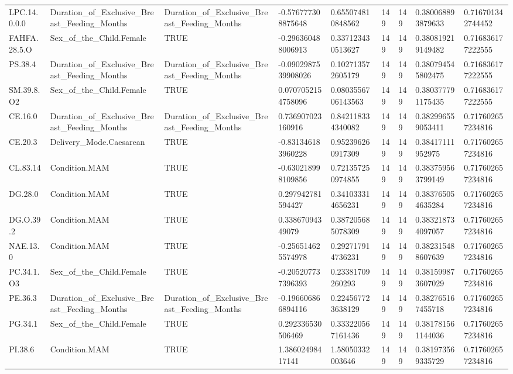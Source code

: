 \begin{longtable}{lllllllll}
LPC.14.0.0.0 & Duration\_of\_Exclusive\_Breast\_Feeding\_Months & Duration\_of\_Exclusive\_Breast\_Feeding\_Months & -0.576777308875648 & 0.655074810848562 & 149 & 149 & 0.380068893879633 & 0.716701342744452 \\
FAHFA.28.5.O & Sex\_of\_the\_Child.Female & TRUE & -0.296360488006913 & 0.337123430513627 & 149 & 149 & 0.380819219149482 & 0.716836177222555 \\
PS.38.4 & Duration\_of\_Exclusive\_Breast\_Feeding\_Months & Duration\_of\_Exclusive\_Breast\_Feeding\_Months & -0.0902987539908026 & 0.102713572605179 & 149 & 149 & 0.380794545802475 & 0.716836177222555 \\
SM.39.8.O2 & Sex\_of\_the\_Child.Female & TRUE & 0.0707052154758096 & 0.0803556706143563 & 149 & 149 & 0.380377791175435 & 0.716836177222555 \\
CE.16.0 & Duration\_of\_Exclusive\_Breast\_Feeding\_Months & Duration\_of\_Exclusive\_Breast\_Feeding\_Months & 0.736907023160916 & 0.842118334340082 & 149 & 149 & 0.382996559053411 & 0.717602657234816 \\
CE.20.3 & Delivery\_Mode.Caesarean & TRUE & -0.831346183960228 & 0.952396260917309 & 149 & 149 & 0.38417111952975 & 0.717602657234816 \\
CL.83.14 & Condition.MAM & TRUE & -0.630218998109856 & 0.721357250974855 & 149 & 149 & 0.383759563799149 & 0.717602657234816 \\
DG.28.0 & Condition.MAM & TRUE & 0.297942781594427 & 0.341033314656231 & 149 & 149 & 0.383765054635284 & 0.717602657234816 \\
DG.O.39.2 & Condition.MAM & TRUE & 0.33867094349079 & 0.387205685078309 & 149 & 149 & 0.383218734097057 & 0.717602657234816 \\
NAE.13.0 & Condition.MAM & TRUE & -0.256514625574978 & 0.292717914736231 & 149 & 149 & 0.382315488607639 & 0.717602657234816 \\
PC.34.1.O3 & Sex\_of\_the\_Child.Female & TRUE & -0.205207737396393 & 0.23381709260293 & 149 & 149 & 0.381599873607029 & 0.717602657234816 \\
PE.36.3 & Duration\_of\_Exclusive\_Breast\_Feeding\_Months & Duration\_of\_Exclusive\_Breast\_Feeding\_Months & -0.196606866894116 & 0.224567723638129 & 149 & 149 & 0.382765167455718 & 0.717602657234816 \\
PG.34.1 & Sex\_of\_the\_Child.Female & TRUE & 0.292336530506469 & 0.333220567161436 & 149 & 149 & 0.381781561144036 & 0.717602657234816 \\
PI.38.6 & Condition.MAM & TRUE & 1.38602498417141 & 1.58050332003646 & 149 & 149 & 0.381973569335729 & 0.717602657234816 \\

\end{longtable}
